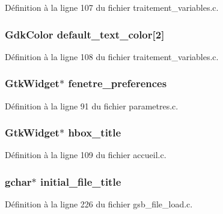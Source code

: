 Définition à la ligne 107 du fichier traitement\_\-variables.c.

\subsubsection[{default\_\-text\_\-color}]{\setlength{\rightskip}{0pt plus 5cm}GdkColor {\bf default\_\-text\_\-color}[2]}\label{affichage_8c_ad2907ac01ffda6d7aefaddefb2369c9f}


Définition à la ligne 108 du fichier traitement\_\-variables.c.

\subsubsection[{fenetre\_\-preferences}]{\setlength{\rightskip}{0pt plus 5cm}GtkWidget$\ast$ {\bf fenetre\_\-preferences}}\label{affichage_8c_a280b98575c3c9e0b637ec78b157a1ff4}


Définition à la ligne 91 du fichier parametres.c.

\subsubsection[{hbox\_\-title}]{\setlength{\rightskip}{0pt plus 5cm}GtkWidget$\ast$ {\bf hbox\_\-title}}\label{affichage_8c_a5c4177f9546fc12979a20354c696c96a}


Définition à la ligne 109 du fichier accueil.c.

\subsubsection[{initial\_\-file\_\-title}]{\setlength{\rightskip}{0pt plus 5cm}gchar$\ast$ {\bf initial\_\-file\_\-title}}\label{affichage_8c_ac7526506154f32a987a2cd923aba4d7c}


Définition à la ligne 226 du fichier gsb\_\-file\_\-load.c.

